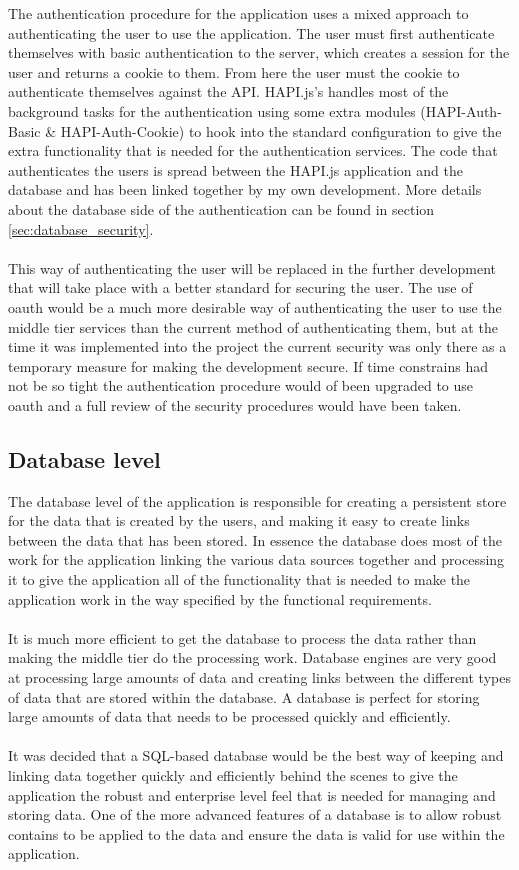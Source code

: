 The authentication procedure for the application uses a mixed approach to authenticating the user to use the application. The user must first authenticate themselves with basic authentication to the server, which creates a session for the user and returns a cookie to them. From here the user must the cookie to authenticate themselves against the API. HAPI.js's handles most of the background tasks for the authentication using some extra modules (HAPI-Auth-Basic \& HAPI-Auth-Cookie) to hook into the standard configuration to give the extra functionality that is needed for the authentication services. The code that authenticates the users is spread between the HAPI.js application and the database and has been linked together by my own development. More details about the database side of the authentication can be found in section \ref{sec:database_security}.\\
\\
This way of authenticating the user will be replaced in the further development that will take place with a better standard for securing the user. The use of oauth would be a much more desirable way of authenticating the user to use the middle tier services than the current method of authenticating them, but at the time it was implemented into the project the current security was only there as a temporary measure for making the development secure. If time constrains had not be so tight the authentication procedure would of been upgraded to use oauth and a full review of the security procedures would have been taken.

\subsection{Database level}

The database level of the application is responsible for creating a persistent store for the data that is created by the users, and making it easy to create links between the data that has been stored. In essence the database does most of the work for the application linking the various data sources together and processing it to give the application all of the functionality that is needed to make the application work in the way specified by the functional requirements.\\
\\
It is much more efficient to get the database to process the data rather than making the middle tier do the processing work. Database engines are very good at processing large amounts of data and creating links between the different types of data that are stored within the database. A database is perfect for storing large amounts of data that needs to be processed quickly and efficiently.\\
\\
It was decided that a SQL-based database would be the best way of keeping and linking data together quickly and efficiently behind the scenes to give the application the robust and enterprise level feel that is needed for managing and storing data. One of the more advanced features of a database is to allow robust contains to be applied to the data and ensure the data is valid for use within the application.

